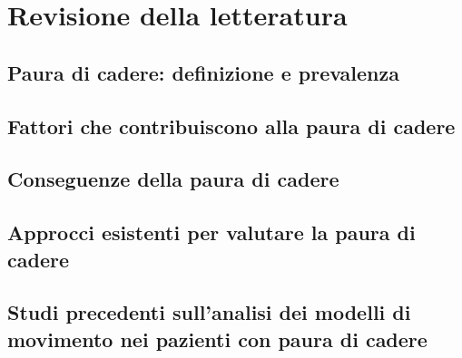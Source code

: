 \chapter{Revisione della letteratura}
    \section{Paura di cadere: definizione e prevalenza}
    \section{Fattori che contribuiscono alla paura di cadere}
    \section{Conseguenze della paura di cadere}
    \section{Approcci esistenti per valutare la paura di cadere}
    \section{Studi precedenti sull'analisi dei modelli di movimento nei pazienti con paura di cadere}
